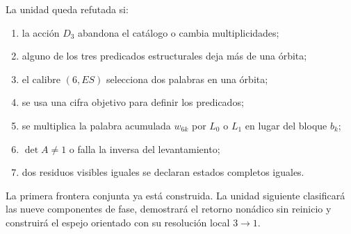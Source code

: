 \begin{criterion}
La unidad queda refutada si:
\begin{enumerate}
 \item la acción \(D_3\) abandona el catálogo o cambia multiplicidades;
 \item alguno de los tres predicados estructurales deja más de una órbita;
 \item el calibre \((6,ES)\) selecciona dos palabras en una órbita;
 \item se usa una cifra objetivo para definir los predicados;
 \item se multiplica la palabra acumulada \(w_{6k}\) por \(L_0\) o
       \(L_1\) en lugar del bloque \(b_k\);
 \item \(\det A\neq1\) o falla la inversa del levantamiento;
 \item dos residuos visibles iguales se declaran estados completos iguales.
\end{enumerate}
\end{criterion}

La primera frontera conjunta ya está construida. La unidad siguiente
clasificará las nueve componentes de fase, demostrará el retorno nonádico
sin reinicio y construirá el espejo orientado con su resolución local
\(3\to1\).
